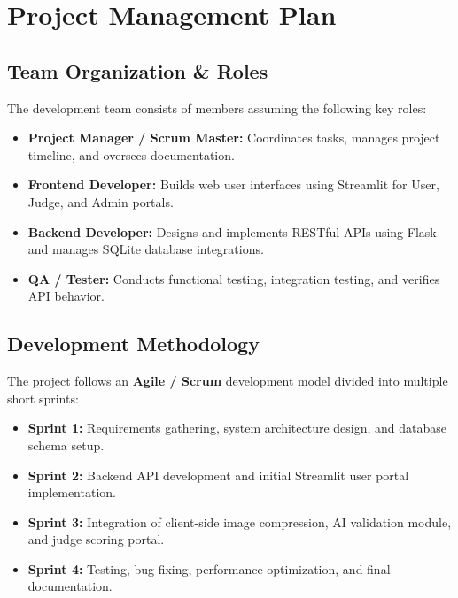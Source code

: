\chapter{Project Management Plan}

\section{Team Organization \& Roles}
The development team consists of members assuming the following key roles:
\begin{itemize}
    \item \textbf{Project Manager / Scrum Master:} Coordinates tasks, manages project timeline, and oversees documentation.
    \item \textbf{Frontend Developer:} Builds web user interfaces using Streamlit for User, Judge, and Admin portals.
    \item \textbf{Backend Developer:} Designs and implements RESTful APIs using Flask and manages SQLite database integrations.
    \item \textbf{QA / Tester:} Conducts functional testing, integration testing, and verifies API behavior.
\end{itemize}

\section{Development Methodology}
The project follows an \textbf{Agile / Scrum} development model divided into multiple short sprints:
\begin{itemize}
    \item \textbf{Sprint 1:} Requirements gathering, system architecture design, and database schema setup.
    \item \textbf{Sprint 2:} Backend API development and initial Streamlit user portal implementation.
    \item \textbf{Sprint 3:} Integration of client-side image compression, AI validation module, and judge scoring portal.
    \item \textbf{Sprint 4:} Testing, bug fixing, performance optimization, and final documentation.
\end{itemize}

